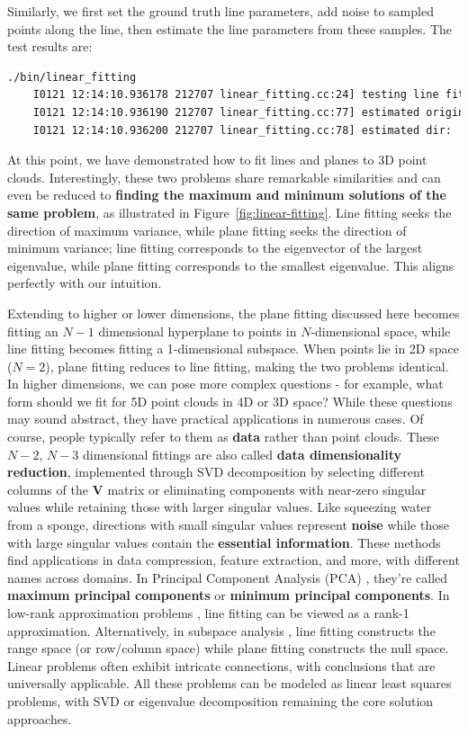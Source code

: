 Similarly, we first set the ground truth line parameters, add noise to sampled points along the line, then estimate the line parameters from these samples. The test results are:

\begin{lstlisting}[language=sh,caption=Terminal output:]
	./bin/linear_fitting
	I0121 12:14:10.936178 212707 linear_fitting.cc:24] testing line fitting
	I0121 12:14:10.936190 212707 linear_fitting.cc:77] estimated origin: 0.102906 0.204955 0.305633, true: 0.1 0.2 0.3
	I0121 12:14:10.936200 212707 linear_fitting.cc:78] estimated dir:  0.45294 0.569855 0.685646, true: 0.455842 0.569803 0.683763
\end{lstlisting}

At this point, we have demonstrated how to fit lines and planes to 3D point clouds. Interestingly, these two problems share remarkable similarities and can even be reduced to \textbf{finding the maximum and minimum solutions of the same problem}, as illustrated in Figure~\ref{fig:linear-fitting}. Line fitting seeks the direction of maximum variance, while plane fitting seeks the direction of minimum variance; line fitting corresponds to the eigenvector of the largest eigenvalue, while plane fitting corresponds to the smallest eigenvalue. This aligns perfectly with our intuition.

Extending to higher or lower dimensions, the plane fitting discussed here becomes fitting an $N-1$ dimensional hyperplane to points in $N$-dimensional space, while line fitting becomes fitting a 1-dimensional subspace. When points lie in 2D space ($N=2$), plane fitting reduces to line fitting, making the two problems identical. In higher dimensions, we can pose more complex questions - for example, what form should we fit for 5D point clouds in 4D or 3D space? While these questions may sound abstract, they have practical applications in numerous cases. Of course, people typically refer to them as \textbf{data} rather than point clouds. These $N-2$, $N-3$ dimensional fittings are also called \textbf{data dimensionality reduction}, implemented through SVD decomposition by selecting different columns of the $\mathbf{V}$ matrix or eliminating components with near-zero singular values while retaining those with larger singular values. Like squeezing water from a sponge, directions with small singular values represent \textbf{noise} while those with large singular values contain the \textbf{essential information}. These methods find applications in data compression, feature extraction, and more, with different names across domains. In Principal Component Analysis (PCA) \cite{Wold1987}, they're called \textbf{maximum principal components} or \textbf{minimum principal components}. In low-rank approximation problems \cite{Eckart1936}, line fitting can be viewed as a rank-1 approximation. Alternatively, in subspace analysis \cite{Lay2005}, line fitting constructs the range space (or row/column space) while plane fitting constructs the null space. Linear problems often exhibit intricate connections, with conclusions that are universally applicable. All these problems can be modeled as linear least squares problems, with SVD or eigenvalue decomposition remaining the core solution approaches.

